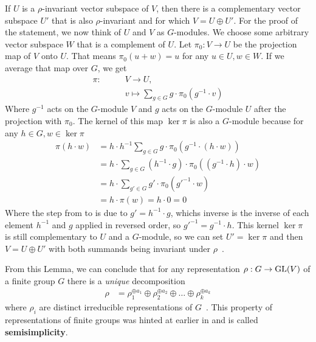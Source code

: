 If $U$ is a $\rho$-invariant vector subspace of $V$, then there is a complementary vector subspace $U'$ that is also $\rho$-invariant and for which $V = U \oplus U'$.
For the proof of the statement, we now think of $U$ and $V$ as $G$-modules.
We choose some arbitrary vector subspace $W$ that is a complement of $U$.
Let $\pi_0: V \to U$ be the projection map of $V$ onto $U$.
That means $\pi_0(u + w) = u$ for any $u \in U, w \in W$.
If we average that map over $G$, we get
\begin{subequations}
\begin{align}
    \pi: \qquad & V \to U, \\
    & v \mapsto \sum_{g \in G} g \cdot \pi_0(g^{-1} \cdot v)
\end{align}
\end{subequations}
Where $g^{-1}$ acts on the $G$-module $V$ and $g$ acts on the $G$-module $U$ after the projection with $\pi_0$.
The kernel of this map $\ker \pi$ is also a $G$-module because for any $h \in G, w \in \ker \pi$
\begin{subequations}
\begin{align}
    \pi(h \cdot w) & = h \cdot h^{-1} \sum_{g \in G} g \cdot \pi_0(g^{-1} \cdot (h \cdot w)) \\
    & = h \cdot \sum_{g \in G} (h^{-1} \cdot g) \cdot \pi_0((g^{-1} \cdot h) \cdot w) \label{equ:proof.maschke.hg} \\
    & = h \cdot \sum_{g' \in G} g' \cdot \pi_0(g'^{-1} \cdot w) \label{equ:proof.maschke.gprime} \\
    & = h \cdot \pi(w) = h \cdot 0 = 0
\end{align}
\end{subequations}
Where the step from  to  is due to $g' = h^{-1} \cdot g$, whichs inverse is the inverse of each element $h^{-1}$ and $g$ applied in reversed order, so $g'^{-1} = g^{-1} \cdot h$.
This kernel $\ker \pi$ is still complementary to $U$ and a $G$-module, so we can set $U' = \ker \pi$ and then $V = U \oplus U'$ with both summands being invariant under $\rho$~\cite{fulton2013}.

From this Lemma, we can conclude that for any representation $\rho: G \to \operatorname{GL}(V)$ of a finite group $G$ there is a \textit{unique} decomposition
\begin{align}
    \rho & = \rho_1^{\oplus a_1} \oplus \rho_2^{\oplus a_2} \oplus \ldots \oplus \rho_k^{\oplus a_k} 
\end{align}
where $\rho_i$ are distinct irreducible representations of $G$~\cite{fulton2013}.
This property of representations of finite groups was hinted at earlier in  and is called \textbf{semisimplicity}.

